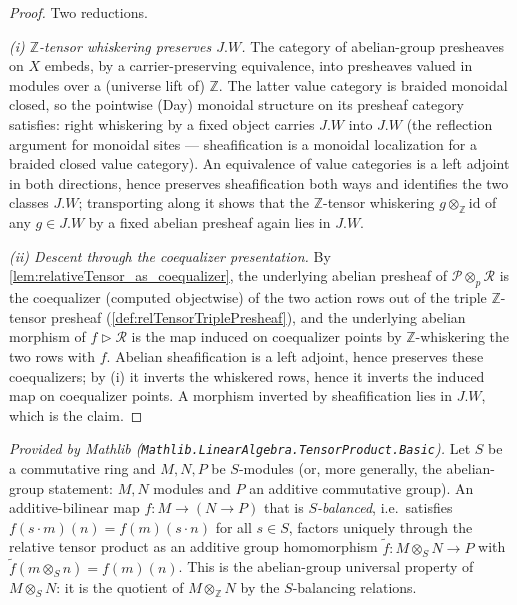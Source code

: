 \begin{proof}
    \leanok
  Two reductions.

  \emph{(i) \(\mathbb{Z}\)-tensor whiskering preserves \(J.W\).} The category
  of abelian-group presheaves on \(X\) embeds, by a carrier-preserving
  equivalence, into presheaves valued in modules over a (universe lift of)
  \(\mathbb{Z}\). The latter value category is braided monoidal closed, so the
  pointwise (Day) monoidal structure on its presheaf category satisfies: right
  whiskering by a fixed object carries \(J.W\) into \(J.W\) (the reflection
  argument for monoidal sites — sheafification is a monoidal localization for a
  braided closed value category). An equivalence of value categories is a left
  adjoint in both directions, hence preserves sheafification both ways and
  identifies the two classes \(J.W\); transporting along it shows that the
  \(\mathbb{Z}\)-tensor whiskering \(g \otimes_{\mathbb{Z}} \mathrm{id}\) of any
  \(g \in J.W\) by a fixed abelian presheaf again lies in \(J.W\).

  \emph{(ii) Descent through the coequalizer presentation.} By
  \cref{lem:relativeTensor_as_coequalizer}, the underlying abelian presheaf of
  \(\mathcal{P} \otimes_p \mathcal{R}\) is the coequalizer (computed objectwise)
  of the two action rows out of the triple \(\mathbb{Z}\)-tensor presheaf
  (\cref{def:relTensorTriplePresheaf}), and the underlying abelian morphism of
  \(f \rhd \mathcal{R}\) is the map induced on coequalizer points by
  \(\mathbb{Z}\)-whiskering the two rows with \(f\). Abelian sheafification is
  a left adjoint, hence preserves these coequalizers; by (i) it inverts the
  whiskered rows, hence it inverts the induced map on coequalizer points. A
  morphism inverted by sheafification lies in \(J.W\), which is the claim.
\end{proof}

\begin{lemma}
  \label{lem:tensorProduct_liftAddHom_mathlib}
  \mathlibok
  \textit{Provided by Mathlib (\texttt{Mathlib.LinearAlgebra.TensorProduct.Basic}).}
  Let \(S\) be a commutative ring and \(M, N, P\) be \(S\)-modules (or, more
  generally, the abelian-group statement: \(M, N\) modules and \(P\) an additive
  commutative group). An additive-bilinear map
  \(f : M \to (N \to P)\) that is \emph{\(S\)-balanced}, i.e.\ satisfies
  \(f(s \cdot m)(n) = f(m)(s \cdot n)\) for all \(s \in S\), factors uniquely
  through the relative tensor product as an additive group homomorphism
  \(\widetilde{f} : M \otimes_S N \to P\) with
  \(\widetilde{f}(m \otimes_S n) = f(m)(n)\). This is the abelian-group universal
  property of \(M \otimes_S N\): it is the quotient of \(M \otimes_{\mathbb{Z}} N\)
  by the \(S\)-balancing relations.
\end{lemma}

